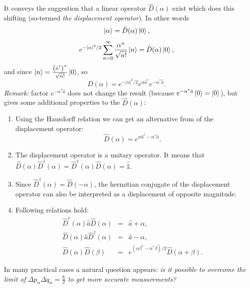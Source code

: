 It conveys the suggestion that a linear operator $\hat{D}(\alpha)$ exist which does this shifting (so-termed \textit{the displacement operator}). In other words
\begin{equation}
	\left\lvert {\alpha} \right\rangle = \hat{D} (\alpha) \left\lvert {0} \right\rangle,
\end{equation}
\begin{equation}
	e^{-|\alpha|^2/2} \sum_{n=0}^{\infty} \frac{\alpha^n}{\sqrt{n!}} \left\lvert {n} \right\rangle  = \hat{D} (\alpha) \left\lvert {0} \right\rangle,
\end{equation}
and since $\left\lvert {n} \right\rangle = \frac{\left( \hat{a}^{\dagger} \right)^n}{\sqrt{n!}} \left\lvert {0} \right\rangle$, so
\begin{equation}
	D(\alpha) = e^{-|\alpha|^2/2} e^{\alpha \hat{a}^{\dagger}} e^{- \alpha^* \hat{a}}.
\end{equation}
\textit{Remark:} factor $e^{- \alpha^* \hat{a}}$ does not change the result (because $e^{- \alpha^* \hat{a}} \left\lvert {0} \right\rangle = \left\lvert {0} \right\rangle$), but gives some additional properties to the $\hat{D}(\alpha)$:
\begin{enumerate}
	\item Using the Hausdorff relation we can get an alternative from of the displacement operator:
	\begin{equation}
		\hat{D}(\alpha) = e^{\alpha \hat{a}^{\dagger} - \alpha^* \hat{a}}.
	\end{equation}
	\item The displacement operator is a unitary operator. It means that $\hat{D}(\alpha) \hat{D}^{\dagger}(\alpha) = \hat{D}^{\dagger}(\alpha) \hat{D}(\alpha) = \hat{\mathbb{1}}$.
	\item Since $\hat{D}^{\dagger}(\alpha) = \hat{D}(-\alpha)$, the hermitian conjugate of the displacement operator can also be interpreted as a displacement of opposite magnitude.
	\item Following relations hold:
	\begin{eqnarray}
		\hat{D}^{\dagger} (\alpha) \hat{a} \hat{D} (\alpha) &=& \hat{a} + \alpha, \\
		\hat{D} (\alpha) \hat{a} \hat{D}^{\dagger} (\alpha) &=& \hat{a} - \alpha, \\
		\hat{D} (\alpha) \hat{D} (\beta) &=& e^{(\alpha \beta^* - \alpha^* \beta)/2} \hat{D} (\alpha + \beta).
	\end{eqnarray}
\end{enumerate}

In many practical cases a natural question appears: \textit{is it possible to overcome the limit of} $\Delta p_{\alpha} \Delta q_{\alpha} = \frac{\hbar}{2}$ \textit{to get more accurate measurements?}

